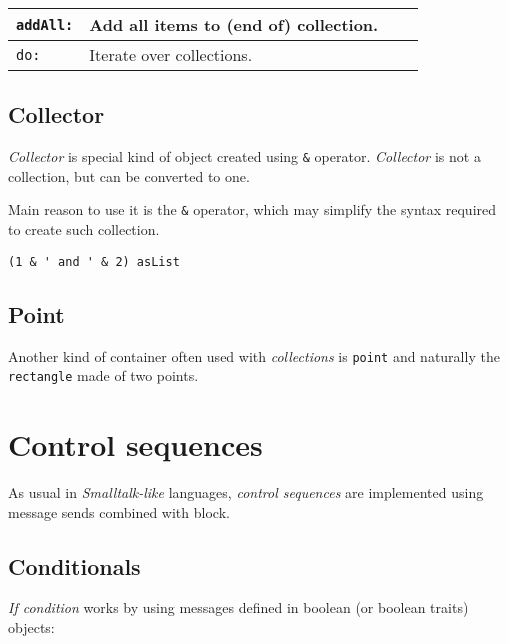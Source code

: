 \documentclass[10pt]{article}
\begin{document}
\begin{multicols*}{3}
{\begin{tabular}{ p{50pt} p{180pt} l l }
\texttt{addAll:}
&
Add all items to (end of) collection.
\\\hline %

\texttt{do:}
&
Iterate over collections.
\\ %
\end{tabular}}



\subsection{Collector}

\textit{Collector} is special kind of object created using \texttt{\&} operator. \textit{Collector} is not a collection, but can be converted to one.

Main reason to use it is the \texttt{\&} operator, which may simplify the syntax required to create such collection.

\nointerlineskip\begin{lstlisting}
(1 & ' and ' & 2) asList
\end{lstlisting}\nointerlineskip



\subsection{Point}
Another kind of container often used with \textit{collections} is \texttt{point} and naturally the \texttt{rectangle} made of two points.




\vfill
\columnbreak
\section{Control sequences}
As usual in \textit{Smalltalk-like} languages, \textit{control sequences} are implemented using message sends combined with block.




\subsection{Conditionals}
\textit{If condition} works by using messages defined in boolean (or boolean traits) objects:


\end{multicols*}
\end{document}
